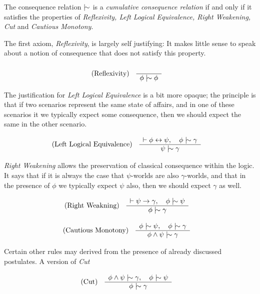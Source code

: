 \begin{definition}
  \label{definition:cumulative-consequence-relation} The consequence relation $\twiddle$ is a \emph{cumulative consequence relation} if and only if it satisfies the properties of \emph{Reflexivity, Left
  Logical Equivalence, Right Weakening, Cut} and \emph{Cautious Monotony}.
\end{definition}

The first axiom, \textit{Reflexivity}, is largely self justifying: It makes little sense to speak about a notion of consequence that does not satisfy this property.

\begin{align}
  \label{postulate:ref}\inferLeft{Reflexivity}{}{\phi \twiddle \phi}
\end{align}

The justification for \textit{Left Logical Equivalence} is a bit more opaque; the principle is that if two scenarios represent the same state of affairs, and in one of these scenarios it we typically
expect some consequence, then we should expect the same in the other scenario.

\begin{align}
  \label{postulate:lle}\inferLeft{Left Logical Equivalence}{\vdash \phi \leftrightarrow \psi, \quad \phi \twiddle \gamma}{\psi \twiddle \gamma}
\end{align}

\textit{Right Weakening} allows the preservation of classical consequence within the logic. It says that if it is always the case that $\psi$-worlds are also $\gamma$-worlds, and that in the presence of
$\phi$ we typically expect $\psi$ also, then we should expect $\gamma$ as well.

\begin{align}
  \label{postulate:rw}\inferLeft{Right Weakning}{\vdash \psi \rightarrow \gamma, \quad \phi \twiddle \psi}{\phi \twiddle \gamma}
\end{align}

\begin{align}
  \label{postulate:cm}\inferLeft{Cautious Monotony}{\phi \twiddle \psi, \quad \phi \twiddle \gamma }{\phi \land \psi \twiddle \gamma}
\end{align}

Certain other rules may derived from the presence of already discussed postulates. A version of \textit{Cut}

\begin{align}
  \label{postulate:cut}\inferLeft{Cut}{\phi \land \psi \twiddle \gamma, \quad \phi \twiddle \psi}{\phi \twiddle \gamma}
\end{align}

